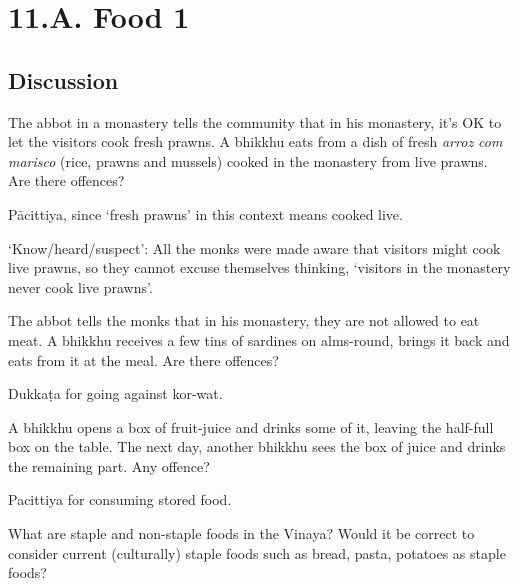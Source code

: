 \chapter{11.A. Food 1}
\renewcommand*{\theChapterTitle}{11.A. Food 1}

\section*{Discussion}

The abbot in a monastery tells the community that in his monastery, it's OK to let the visitors cook fresh prawns.
A bhikkhu eats from a dish of fresh \emph{arroz com marisco} (rice, prawns and mussels) cooked in the monastery from live prawns.
Are there offences?

\begin{solution}
  Pācittiya, since `fresh prawns' in this context means cooked live.

  `Know/heard/suspect': All the monks were made aware that visitors might cook live prawns,
  so they cannot excuse themselves thinking, `visitors in the monastery never cook live prawns'.
\end{solution}

\bigskip
    
The abbot tells the monks that in his monastery, they are not allowed to eat meat.
A bhikkhu receives a few tins of sardines on alms-round, brings it back and eats from it at the meal.
Are there offences?

\begin{solution}
  Dukkaṭa for going against kor-wat.
\end{solution}

\bigskip

A bhikkhu opens a box of fruit-juice and drinks some of it, leaving the
half-full box on the table. The next day, another bhikkhu sees the box of juice
and drinks the remaining part. Any offence?

\begin{solution}
  Pacittiya for consuming stored food.
\end{solution}

\bigskip


What are staple and non-staple foods in the Vinaya?
Would it be correct to consider current (culturally) staple foods such as bread, pasta, potatoes as staple foods?

